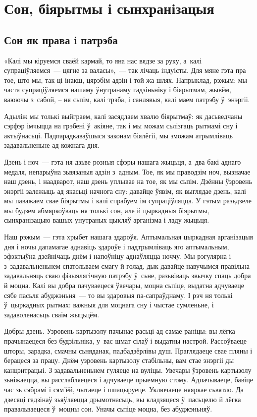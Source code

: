 \chapter{Сон, біярытмы і сынхранізацыя}

\section{Сон як права і патрэба}

«Калі мы кіруемся сваёй кармай, то яна нас вядзе за руку, а~калі супраціўляемся~--- цягне за валасы»,~--- так лічаць індуісты. Для мяне гэта пра тое, што мы, так ці інакш, цярэбім адзін і той жа шлях. Напрыклад, рэжым: мы часта супраціўляемся нашаму ўнутранаму гадзіньніку і біярытмам, жывём, ваюючы з~сабой, -- ня сьпім, калі трэба, і санлявыя, калі маем патрэбу ў~энэргіі.

Адыліж мы толькі выйграем, калі засядлаем хвалю біярытмаў: як дасьведчаны сэрфэр імчыцца на грэбені ў~акіяне, так і мы можам сьлізгаць рытмамі сну і актыўнасьці. Падпарадкаваўшыся законам біялёгіі, мы зможам атрымліваць задавальненьне ад кожнага дня.

Дзень і ноч~--- гэта ня дзьве розныя сфэры нашага жыцьця, а~два бакі аднаго медаля, непарыўна зьвязаныя адзін з~адным. Тое, як мы праводзім ноч, вызначае наш дзень, і наадварот, наш дзень уплывае на тое, як мы сьпім. Дзённы ўзровень энэргіі залежыць ад якасьці начнога сну: давайце ўявім, як выглядае дзень, калі мы паважаем свае біярытмы і калі спрабуем ім супраціўляцца. У гэтым разьдзеле мы будзем абмяркоўваць ня толькі сон, але й цыркадныя біярытмы, сынхранізацыю вашых унутраных цыкляў арганізма і ладу жыцьця.

Наш рэжым~--- гэта хрыбет нашага здароўя. Аптымальная цыркадная арганізацыя дня і ночы дапамагае аднавіць здароўе і падтрымліваць яго аптымальным, эфэктыўна дзейнічаць днём і напоўніцу аднаўляцца ноччу. Мы рэгулярна і з~задавальненьнем спатольваем смагу й голад, дык давайце навучымся правільна задавальняць сваю фізыялягічную патрэбу ў~сьне, разьвіваць звычку спаць добра й моцна. Калі вы добра пачуваецеся ўвечары, моцна сьпіце, выдатна адчуваеце сябе пасьля абуджэньня~--- то вы здаровыя па-сапраўднаму. І рэч ня толькі ў~цыркадных рытмах: важныя для моцнага сну і чыстае сумленьне, і задаволенасьць сваім жыцьцём.

Добры дзень. Узровень картызолу пачынае расьці ад самае раніцы: вы лёгка прачынаецеся без будзільніка, у~вас шмат сілаў і выдатны настрой. Рассоўваеце шторы, зарадка, смачны сьняданак, падбадзёрлівы душ. Праглядаеце свае пляны і берацеся за працу. Днём узровень картызолу стабільны, вам стае энэргіі ды канцэнтрацыі. З задавальненьнем гуляеце на вуліцы. Увечары ўзровень картызолу зьніжаецца, вы расслабляецеся і адчуваеце прыемную стому. Адпачываеце, бавіце час зь сябрамі і сям'ёй, чытаеце і шпацыруеце. Уключаеце няяркае сьвятло. Да дзесяці гадзінаў зьяўляецца дрымотнасьць, вы кладзяцеся ў~пасьцелю й лёгка правальваецеся ў~моцны сон. Уначы сьпіце моцна, без абуджэньняў.

